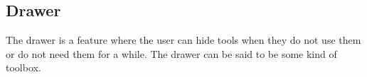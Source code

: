 \subsection{Drawer}
\label{GUI:drawer}

The drawer is a feature where the user can hide tools when they do not use them or do not need them for a while. The drawer can be said to be some kind of toolbox. 
